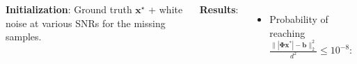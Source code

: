 \documentclass[25pt,a0paper]{tikzposter}
\newcommand{\vct}[1]{\bm{#1}} %
\newcommand{\mtx}[1]{\bm{#1}} %
\begin{document}
\begin{columns}
{%

\textbf{Initialization}: Ground truth $\vct{x}^{\star}$ + white noise at various SNRs for the missing samples.


\textbf{Results}:

\begin{itemize}
    \item Probability of reaching $\displaystyle \frac{\| |\mtx{\Phi} \vct{x}^{\ast} | - \vct{b} \|_2^2}{d^2} \le 10^{-8}$:
\end{itemize}

}
\end{columns}
\end{document}

